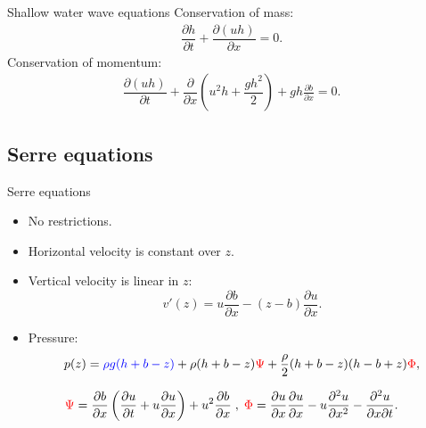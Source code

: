 \documentclass[pdf]{beamer}
\begin{document}
\begin{frame}{Shallow water wave equations}
		Conservation of mass:
		\begin{gather*}
		\dfrac{\partial h}{\partial t} + \dfrac{\partial (uh)}{\partial x} = 0.
		\end{gather*}
		Conservation of momentum:
		\begin{gather*}
		\dfrac{\partial (uh)}{\partial t} + \dfrac{\partial}{\partial x} \left ( u^2h + \dfrac{gh^2}{2}\right ) + gh \frac{\partial b}{\partial x} = 0.
		\label{eq:Serre_momentum}
		\end{gather*}
\end{frame}


\subsection{Serre equations}
\begin{frame}{Serre equations}
		\begin{itemize}
			\item No restrictions.
			\smallskip
			\item Horizontal velocity is constant over $z$.
			\item Vertical velocity is linear in $z$:
						 $$v'(z) = u\frac{\partial b}{\partial x} - (z - b)\frac{\partial u}{\partial x}.$$
		    \item Pressure:
		    $$p(z) = {\color{blue} \rho g(h + b - z)} + \rho(h + b - z)  {\color{red} \Psi }  + \frac{\rho}{2}(h+b - z)(h - b + z) {\color{red} \Phi } ,$$
			\end{itemize}
		\[ {\color{red} \Psi }  = \dfrac{\partial b}{\partial x}\left(\dfrac{\partial u}{\partial t} + u\dfrac{\partial u}{\partial x} \right)  + u^2\dfrac{\partial b}{\partial x} \;, \; 
		{\color{red} \Phi }  = \dfrac{\partial u }{\partial x} \dfrac{\partial u}{\partial x} -u \dfrac{\partial^2 u}{\partial x^2}  - \dfrac{\partial^2 u}{\partial x \partial t} . \]
\end{frame}
\end{document}
